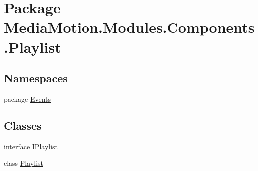 \hypertarget{namespace_media_motion_1_1_modules_1_1_components_1_1_playlist}{\section{Package Media\+Motion.\+Modules.\+Components.\+Playlist}
\label{namespace_media_motion_1_1_modules_1_1_components_1_1_playlist}
}
\subsection*{Namespaces}
\begin{DoxyCompactItemize}
\item 
package \hyperlink{namespace_media_motion_1_1_modules_1_1_components_1_1_playlist_1_1_events}{Events}
\end{DoxyCompactItemize}
\subsection*{Classes}
\begin{DoxyCompactItemize}
\item 
interface \hyperlink{interface_media_motion_1_1_modules_1_1_components_1_1_playlist_1_1_i_playlist}{I\+Playlist}
\item 
class \hyperlink{class_media_motion_1_1_modules_1_1_components_1_1_playlist_1_1_playlist}{Playlist}
\end{DoxyCompactItemize}
